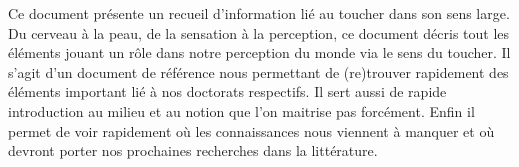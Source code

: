 Ce document présente un recueil d’information lié au toucher dans son sens large. Du cerveau à la peau, de la sensation à la perception, ce document décris tout les éléments jouant un rôle dans notre perception du monde via le sens du toucher. Il s’agit d’un document de référence nous permettant de (re)trouver rapidement des éléments important lié à nos doctorats respectifs. Il sert aussi de rapide introduction au milieu et au notion que l’on maitrise pas forcément. Enfin il permet de voir rapidement où les connaissances nous viennent à manquer et où devront porter nos prochaines recherches dans la littérature.
